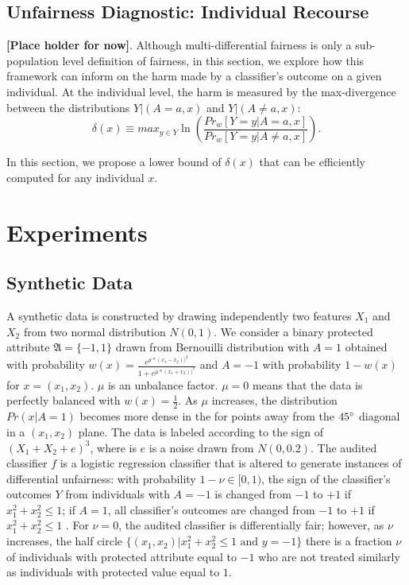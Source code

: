 \documentclass{article}
\begin{document}
\subsection{Unfairness Diagnostic: Individual Recourse}
\textbf{[Place holder for now]}. Although multi-differential fairness is only a sub-population level definition of fairness, in this section, we explore how this framework can inform on the harm made by a classifier's outcome on a given individual. At the individual level, the harm is measured by the max-divergence between the distributions $Y|(A=a, x)$ and $Y|(A\neq a, x)$:
\begin{equation}
\delta(x)\equiv max_{y\in Y}\ln\left(\frac{Pr_{w}[Y=y|A=a, x]}{Pr_{w}[Y=y|A\neq a, x]}\right).
\end{equation}

In this section, we propose a lower bound of $\delta(x)$ that can be efficiently computed for any individual $x$. 


\section{Experiments}

\subsection{Synthetic Data}
A synthetic data is constructed by drawing independently two features $X_{1}$ and $X_{2}$ from two normal distribution $N(0, 1)$. We consider a binary protected attribute  $\mathfrak{A}=\{-1, 1\}$ drawn from Bernouilli distribution with $A=1$ obtained with probability $w(x)=\frac{e^{\mu * (x_{1}- x_{2}))^{2}}}{1 + e^{\mu * (x_{1}+ x_{2}))^{2}}}$ and $A=-1$ with probability $1-w(x)$ for $x=(x_{1}, x_{2})$. $\mu$ is an unbalance factor. $\mu=0$ means that the data is perfectly balanced with $w(x)=\frac{1}{2}$. As $\mu$ increases, the distribution $Pr(x|A=1)$ becomes more dense in the for points away from the $45\degree$ diagonal in a $(x_{1}, x_{2})$ plane. The data is labeled according to the sign of $(X_{1} + X_{2} + e) ^{3}$, where is $e$ is a noise drawn from $N(0, 0.2)$. The audited classifier $f$ is a logistic regression classifier that is altered to generate instances of differential unfairness: with probability $1-\nu\in[0, 1)$, the sign of the classifier's outcomes $Y$ from individuals with $A=-1$ is changed from $-1$ to $+1$ if $x^{2}_{1} + x^{2}_{2} \leq 1$; if $A=1$, all classifier's outcomes are changed from $-1$ to $+1$ if $x^{2}_{1} + x^{2}_{2} \leq 1$ . For $\nu=0$, the audited classifier is differentially fair; however, as $\nu$ increases, the half circle $\{(x_{1}, x_{2})|x^{2}_{1} + x^{2}_{2} \leq 1 \mbox{ and } y=-1\}$ there is a fraction $\nu$ of individuals with protected attribute equal to $-1$ who are not treated similarly as individuals with protected value equal to $1$. 
\end{document}
